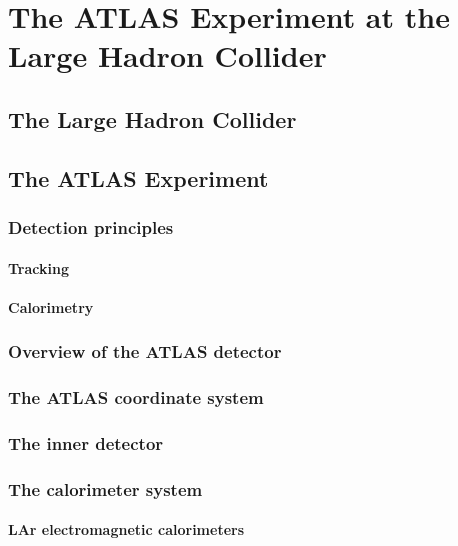 
\chapter{The ATLAS Experiment at the Large Hadron Collider}
\label{chap:experiment}

\section{The Large Hadron Collider}
\section{The ATLAS Experiment}

\subsection{Detection principles}
\label{subsec:measurement-principles}

\subsubsection{Tracking}

\subsubsection{Calorimetry}

\subsection{Overview of the ATLAS detector}

\subsection{The ATLAS coordinate system}

\subsection{The inner detector}

\subsection{The calorimeter system}
\subsubsection{LAr electromagnetic calorimeters}

